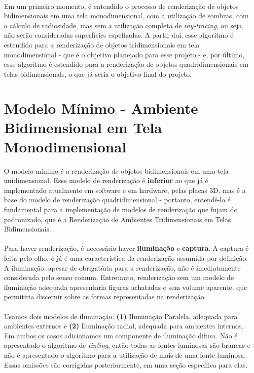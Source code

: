 \documentclass{article}
\begin{document}
	\paragraph{}
	Em um primeiro momento, é entendido o processo de renderização de objetos bidimensionais em uma tela monodimensional, com a utilização de sombras, com o cálculo de radiosidade, mas sem a utilização completa de \textit{ray-tracing}, ou seja, não serão consideradas superfícies espelhadas. A partir daí, esse algoritmo é estendido para a renderização de objetos tridimensionais em tela monodimensional - que é o objetivo planejado para esse projeto - e, por último, esse algoritmo é estendido para a renderização de objetos quadridimensionais em telas bidimensionals, o que já seria o objetivo final do projeto. 
	
	\section{Modelo Mínimo - Ambiente Bidimensional em Tela Monodimensional} \label{modelo-minimo}
	
	\paragraph{}
	O modelo mínimo é a renderização de objetos bidimensionais em uma tela unidimensional. Esse modelo de renderização é \textbf{inferior} ao que já é implementado atualmente em software e em hardware, pelas placas 3D, mas é a base do modelo de renderização quadridimensional - portanto, entendê-lo é fundamental para a implementação de modelos de renderização que fujam do padronizado, que é a Renderização de Ambientes Tridimensionais em Telas Bidimensionais.
	
	\paragraph{}
	Para haver renderização, é necessário haver \textbf{iluminação} e \textbf{captura}. A captura é feita pelo olho, é já é uma característica da renderização assumida por definição. A iluminação, apesar de obrigatória para a renderização, não é imediatamente considerada pelo senso comum. Entretanto, renderização sem um modelo de iluminação adequada apresentaria figuras achatadas e sem volume aparente, que permitiria discernir sobre as formas representadas na renderização.
	
	\paragraph{}
	Usamos dois modelos de iluminação: \textbf{(1)} Iluminação Paralela, adequada para ambientes externos e \textbf{(2)} Iluminação radial, adequada para ambientes internos. Em ambos os casos adicionamos um componente de iluminação difusa. Não é apresentado o algoritmo de \textit{tinting}, então todas as fontes luminosas são brancas e não é apresentado o algoritmo para a utilização de mais de uma fonte luminosa. Essas omissões são corrigidas posteriormente, em uma seção específica para elas.	
	
\end{document}
